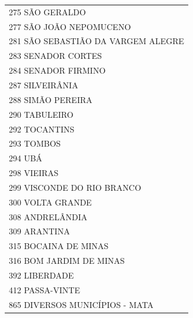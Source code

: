 \documentclass{article}
\begin{document}
\begin{longtable}[c]{m{18cm}}
\multicolumn{1}{l}{ \hspace{2em} 275 SÃO GERALDO } \\
\multicolumn{1}{l}{ \hspace{2em} 277 SÃO JOÃO NEPOMUCENO } \\
\multicolumn{1}{l}{ \hspace{2em} 281 SÃO SEBASTIÃO DA VARGEM ALEGRE } \\
\multicolumn{1}{l}{ \hspace{2em} 283 SENADOR CORTES } \\
\multicolumn{1}{l}{ \hspace{2em} 284 SENADOR FIRMINO } \\
\multicolumn{1}{l}{ \hspace{2em} 287 SILVEIRÂNIA } \\
\multicolumn{1}{l}{ \hspace{2em} 288 SIMÃO PEREIRA } \\
\multicolumn{1}{l}{ \hspace{2em} 290 TABULEIRO } \\
\multicolumn{1}{l}{ \hspace{2em} 292 TOCANTINS } \\
\multicolumn{1}{l}{ \hspace{2em} 293 TOMBOS } \\
\multicolumn{1}{l}{ \hspace{2em} 294 UBÁ } \\
\multicolumn{1}{l}{ \hspace{2em} 298 VIEIRAS } \\
\multicolumn{1}{l}{ \hspace{2em} 299 VISCONDE DO RIO BRANCO } \\
\multicolumn{1}{l}{ \hspace{2em} 300 VOLTA GRANDE } \\
\multicolumn{1}{l}{ \hspace{2em} 308 ANDRELÂNDIA } \\
\multicolumn{1}{l}{ \hspace{2em} 309 ARANTINA } \\
\multicolumn{1}{l}{ \hspace{2em} 315 BOCAINA DE MINAS } \\
\multicolumn{1}{l}{ \hspace{2em} 316 BOM JARDIM DE MINAS } \\
\multicolumn{1}{l}{ \hspace{2em} 392 LIBERDADE } \\
\multicolumn{1}{l}{ \hspace{2em} 412 PASSA-VINTE } \\
\multicolumn{1}{l}{ \hspace{2em} 865 DIVERSOS MUNICÍPIOS - MATA } \\
\end{longtable}
\end{document}
